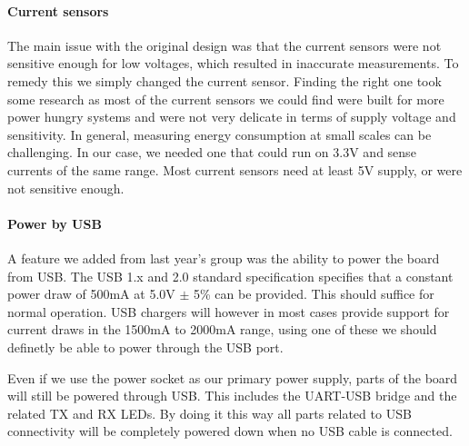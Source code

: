\paragraph{Current sensors} \label{psu:current_sensors}
The main issue with the original design was that the current sensors were not
sensitive enough for low voltages, which resulted in inaccurate measurements. To
remedy this we simply changed the current sensor. Finding the right one took
some research as most of the current sensors we could find were built for more
power hungry systems and were not very delicate in terms of supply voltage and
sensitivity. In general, measuring energy consumption at small scales 
 can be challenging. 
In our case, we needed one that could run on 3.3V and
sense currents of the same range. Most current sensors need at least 5V supply,
or were not sensitive enough.

\paragraph{Power by USB} \label{psu:usb}
A feature we added from last year's group was the ability to power the board
from USB. The USB 1.x and 2.0 standard specification specifies that a constant
power draw of 500mA at 5.0V $\pm$ 5\% can be provided.  This should suffice for normal operation.
USB chargers will however in most cases provide support for current draws in
the 1500mA to 2000mA range, using one of these we should definetly be able to
power through the USB port.

Even if we use the power socket as our primary power supply, parts of the board
will still be powered through USB. This includes the UART-USB bridge and the 
related TX and RX LEDs. By doing it this way all parts related to USB connectivity
will be completely powered down when no USB cable is connected.
